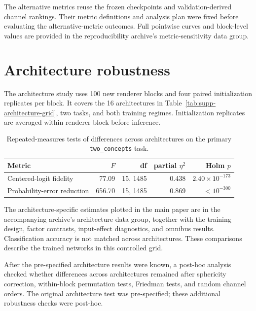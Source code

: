 \documentclass[pdflatex,sn-basic]{sn-jnl}
\begin{document}
The alternative metrics reuse the frozen checkpoints and validation-derived channel rankings. Their metric definitions and analysis plan were fixed before evaluating the alternative-metric outcomes. Full pointwise curves and block-level values are provided in the reproducibility archive's metric-sensitivity data group.

\section{Architecture robustness}\label{supp:architecture}

The architecture study uses 100 new renderer blocks and four paired initialization replicates per block. It covers the 16 architectures in Table~\ref{tab:supp-architecture-grid}, two tasks, and both training regimes. Initialization replicates are averaged within renderer block before inference.

\begin{table}[h]
\caption{Repeated-measures tests of differences across architectures on the primary \texttt{two\_concepts} task.}
\label{tab:supp-architecture-omnibus}
\centering
\small
\begin{tabular}{lrrrr}
\toprule
Metric & $F$ & df & partial $\eta^2$ & Holm $p$ \\
\midrule
Centered-logit fidelity & 77.09 & 15, 1485 & 0.438 & $2.40\times10^{-173}$ \\
Probability-error reduction & 656.70 & 15, 1485 & 0.869 & $<10^{-300}$ \\
\bottomrule
\end{tabular}
\end{table}

The architecture-specific estimates plotted in the main paper are in the accompanying archive's architecture data group, together with the training design, factor contrasts, input-effect diagnostics, and omnibus results. Classification accuracy is not matched across architectures. These comparisons describe the trained networks in this controlled grid.

After the pre-specified architecture results were known, a post-hoc analysis checked whether differences across architectures remained after sphericity correction, within-block permutation tests, Friedman tests, and random channel orders. The original architecture test was pre-specified; these additional robustness checks were post-hoc.
\end{document}
